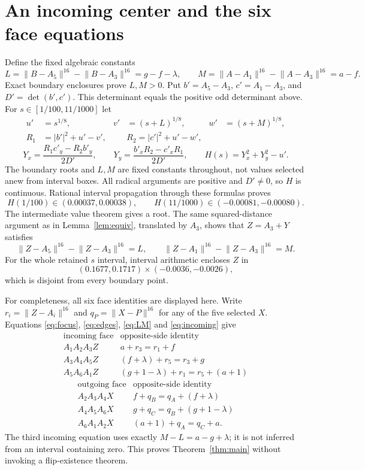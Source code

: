 \documentclass[11pt]{article}
\newcommand{\N}[2]{\lVert #1-#2\rVert^{16}}
\newcommand{\detv}[2]{\det(#1,#2)}
\begin{document}
\section{An incoming center and the six face equations}
Define the fixed algebraic constants
\begin{equation}\label{eq:LM}
 L=\N{B}{A_5}-\N{B}{A_3}=g-f-\lambda,\qquad
 M=\N{A}{A_1}-\N{A}{A_3}=a-f.
\end{equation}
Exact boundary enclosures prove $L,M>0$. Put $b'=A_5-A_3$, $c'=A_1-A_3$, and $D'=\detv{b'}{c'}$. This determinant equals the positive odd determinant above. For $s\in[1/100,11/1000]$ let
\begin{align*}
 u'&=s^{1/8},& v'&=(s+L)^{1/8},& w'&=(s+M)^{1/8},\\
 R_1&=|b'|^2+u'-v',&& R_2=|c'|^2+u'-w',
\end{align*}
\[
 Y_x=\frac{R_1c'_y-R_2b'_y}{2D'},\qquad
 Y_y=\frac{b'_xR_2-c'_xR_1}{2D'},\qquad
 H(s)=Y_x^2+Y_y^2-u'.
\]
The boundary roots and $L,M$ are fixed constants throughout, not values selected anew from interval boxes. All radical arguments are positive and $D'\ne0$, so $H$ is continuous. Rational interval propagation through these formulas proves
\[
 H(1/100)\in(0.00037,0.00038),\qquad
 H(11/1000)\in(-0.00081,-0.00080).
\]
The intermediate value theorem gives a root. The same squared-distance argument as in Lemma~\ref{lem:equiv}, translated by $A_3$, shows that $Z=A_3+Y$ satisfies
\begin{equation}\label{eq:incoming}
 \N{Z}{A_5}-\N{Z}{A_3}=L,\qquad
 \N{Z}{A_1}-\N{Z}{A_3}=M.
\end{equation}
For the whole retained $s$ interval, interval arithmetic encloses $Z$ in
\[
 (0.1677,0.1717)\mathbin{\times}(-0.0036,-0.0026),
\]
which is disjoint from every boundary point.

For completeness, all six face identities are displayed here. Write $r_i=\N{Z}{A_i}$ and $q_P=\N{X}{P}$ for any of the five selected $X$. Equations \eqref{eq:focus}, \eqref{eq:edges}, \eqref{eq:LM} and \eqref{eq:incoming} give
\[
\begin{array}{c|l}
\text{incoming face}&\text{opposite-side identity}\\\hline
 A_1A_2A_3Z&a+r_3=r_1+f\\
 A_3A_4A_5Z&(f+\lambda)+r_5=r_3+g\\
 A_5A_6A_1Z&(g+1-\lambda)+r_1=r_5+(a+1)
\end{array}
\]
\[
\begin{array}{c|l}
\text{outgoing face}&\text{opposite-side identity}\\\hline
 A_2A_3A_4X&f+q_B=q_A+(f+\lambda)\\
 A_4A_5A_6X&g+q_C=q_B+(g+1-\lambda)\\
 A_6A_1A_2X&(a+1)+q_A=q_C+a.
\end{array}
\]
The third incoming equation uses exactly $M-L=a-g+\lambda$; it is not inferred from an interval containing zero. This proves Theorem~\ref{thm:main} without invoking a flip-existence theorem.
\end{document}
